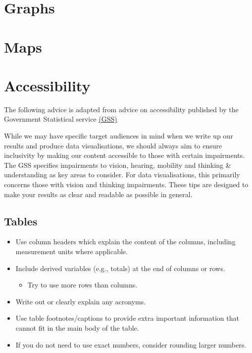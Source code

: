 \documentclass[
]{book}
\providecommand{\tightlist}{%
  \setlength{\itemsep}{0pt}\setlength{\parskip}{0pt}}
\begin{document}
\hypertarget{graphs}{%
\chapter{Graphs}\label{graphs}}

\hypertarget{maps}{%
\chapter{Maps}\label{maps}}

\hypertarget{access}{%
\chapter{Accessibility}\label{access}}

The following advice is adapted from advice on accessibility published by the Government Statistical service \href{https://gss.civilservice.gov.uk/policy-store/introduction-to-data-visualisation/\#section-8}{(GSS)}

While we may have specific target audiences in mind when we write up our results and produce data visualisations, we should always aim to ensure inclusivity by making our content accessible to those with certain impairments. The GSS specifies impairments to vision, hearing, mobility and thinking \& understanding as key areas to consider. For data visualisations, this primarily concerns those with vision and thinking impairments. These tips are designed to make your results as clear and readable as possible in general.

\hypertarget{tables-1}{%
\section{Tables}\label{tables-1}}

\begin{itemize}
\tightlist
\item
  Use column headers which explain the content of the columns, including measurement units where applicable.
\item
  Include derived variables (e.g., totals) at the end of columns or rows.

  \begin{itemize}
  \tightlist
  \item
    Try to use more rows than columns.
  \end{itemize}
\item
  Write out or clearly explain any acronyms.
\item
  Use table footnotes/captions to provide extra important information that cannot fit in the main body of the table.
\item
  If you do not need to use exact numbers, consider rounding larger numbers.
\end{itemize}
\end{document}
